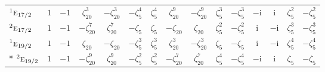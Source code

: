 \documentclass[10pt,a4paper]{article}
\numberwithin{equation}{section}
\newcommand{\irr}[1]{\text{\normalfont\scshape #1}}
\newcommand{\conjpair}[1]{{}^{#1}}
\newcommand{\iunit}{\mathrm{i}}
\newcommand{\rootunity}[1]{\zeta_{#1}}
\begin{document}
{\begin{longtable}{@{}lcccccccccccccc@{}}
$\conjpair{1}\irr{e}_{17/2}$ & $1$ & $-1$ & $\rootunity{20}^{3}$ & $-\rootunity{20}^{3}$ & $-\rootunity{5}^{4}$ & $\rootunity{5}^{4}$ & $\rootunity{20}^{9}$ & $-\rootunity{20}^{9}$ & $\rootunity{5}^{3}$ & $-\rootunity{5}^{3}$ & $-\iunit{}$ & $\iunit{}$ & $\rootunity{5}^{2}$ & $-\rootunity{5}^{2}$\\
$\conjpair{2}\irr{e}_{17/2}$ & $1$ & $-1$ & $-\rootunity{20}^{7}$ & $\rootunity{20}^{7}$ & $-\rootunity{5}$ & $\rootunity{5}$ & $-\rootunity{20}$ & $\rootunity{20}$ & $\rootunity{5}^{2}$ & $-\rootunity{5}^{2}$ & $\iunit{}$ & $-\iunit{}$ & $\rootunity{5}^{3}$ & $-\rootunity{5}^{3}$\\
$\conjpair{1}\irr{e}_{19/2}$ & $1$ & $-1$ & $\rootunity{20}$ & $-\rootunity{20}$ & $-\rootunity{5}^{3}$ & $\rootunity{5}^{3}$ & $\rootunity{20}^{3}$ & $-\rootunity{20}^{3}$ & $\rootunity{5}$ & $-\rootunity{5}$ & $\iunit{}$ & $-\iunit{}$ & $\rootunity{5}^{4}$ & $-\rootunity{5}^{4}$\\*
$\conjpair{2}\irr{e}_{19/2}$ & $1$ & $-1$ & $-\rootunity{20}^{9}$ & $\rootunity{20}^{9}$ & $-\rootunity{5}^{2}$ & $\rootunity{5}^{2}$ & $-\rootunity{20}^{7}$ & $\rootunity{20}^{7}$ & $\rootunity{5}^{4}$ & $-\rootunity{5}^{4}$ & $-\iunit{}$ & $\iunit{}$ & $\rootunity{5}$ & $-\rootunity{5}$\\
\bottomrule\end{longtable}}
\end{document}

